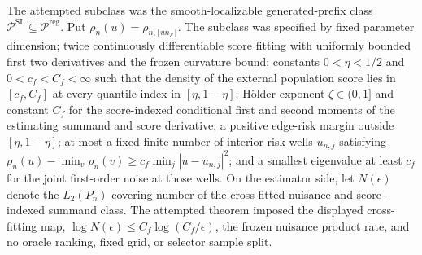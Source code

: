 The attempted subclass was the smooth-localizable generated-prefix class \(\mathcal P^{\mathrm{SL}}\subseteq\mathcal P^{\mathrm{reg}}\).  Put \(\rho_n(u)=\rho_{n,\lfloor un_{\mathcal E}\rfloor}\).  The subclass was specified by fixed parameter dimension; twice continuously differentiable score fitting with uniformly bounded first two derivatives and the frozen curvature bound; constants \(0<\eta<1/2\) and \(0<c_f<C_f<\infty\) such that the density of the external population score lies in \([c_f,C_f]\) at every quantile index in \([\eta,1-\eta]\); H\"older exponent \(\zeta\in(0,1]\) and constant \(C_f\) for the score-indexed conditional first and second moments of the estimating summand and score derivative; a positive edge-risk margin outside \([\eta,1-\eta]\); at most a fixed finite number of interior risk wells \(u_{n,j}\) satisfying \(\rho_n(u)-\min_v\rho_n(v)\geq c_f\min_j|u-u_{n,j}|^2\); and a smallest eigenvalue at least \(c_f\) for the joint first-order noise at those wells.  On the estimator side, let \(N(\epsilon)\) denote the \(L_2(P_n)\) covering number of the cross-fitted nuisance and score-indexed summand class.  The attempted theorem imposed the displayed cross-fitting map, \(\log N(\epsilon)\leq C_f\log(C_f/\epsilon)\), the frozen nuisance product rate, and no oracle ranking, fixed grid, or selector sample split.


